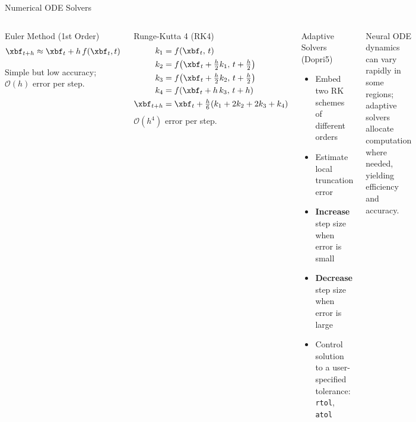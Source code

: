 \documentclass[aspectratio=169,xcolor=dvipsnames,svgnames,x11names,fleqn]{beamer}
\begin{document}
\begin{frame}{Numerical ODE Solvers}
\scriptsize
\begin{columns}
\begin{tblockWing}{Euler Method (1st Order)}
\vspace{-20pt}
\begin{align*}
  \xbf_{t+h} \approx \xbf_t + h\, f(\xbf_t, t)
\end{align*}

Simple but low accuracy; $\mathcal{O}(h)$ error per step.
\end{tblockWing}
\vspace{2pt}
\begin{tblockWing}{Runge-Kutta 4 (RK4)}
\vspace{-20pt}
\begin{align*}
  k_1 &= f(\xbf_t,\, t)\\
  k_2 &= f\!\left(\xbf_t + \tfrac{h}{2}k_1,\, t+\tfrac{h}{2}\right)\\
  k_3 &= f\!\left(\xbf_t + \tfrac{h}{2}k_2,\, t+\tfrac{h}{2}\right)\\
  k_4 &= f(\xbf_t + h\, k_3,\, t+h)\\
  \xbf_{t+h} &= \xbf_t + \tfrac{h}{6}(k_1 + 2k_2 + 2k_3 + k_4)
\end{align*}
$\mathcal{O}(h^4)$ error per step.
\end{tblockWing}
\begin{tblockWing}{Adaptive Solvers (Dopri5)}
\begin{itemize}
  \item Embed two RK schemes of different orders
  \item Estimate local truncation error
  \item \textbf{Increase} step size when error is small
  \item \textbf{Decrease} step size when error is large
  \item Control solution to a user-specified tolerance: \texttt{rtol}, \texttt{atol}
\end{itemize}
\end{tblockWing}
\vspace{4pt}
\begin{alertblock}{}
Neural ODE dynamics can vary rapidly in some regions; adaptive solvers allocate computation where needed, yielding efficiency and accuracy.
\end{alertblock}
\end{columns}
\end{frame}
\end{document}
